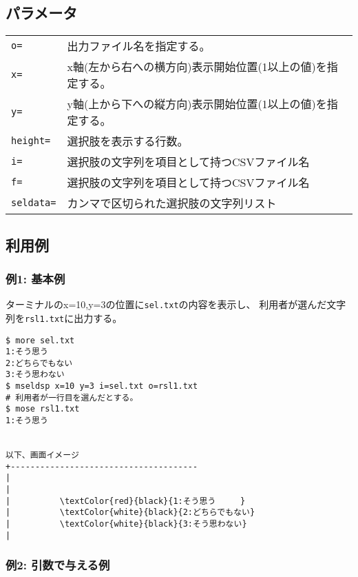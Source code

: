\subsection*{パラメータ}
\begin{table}[htbp]
{\small
\begin{tabular}{ll}
\verb|o=|   & 出力ファイル名を指定する。\\
\verb|x=|   & x軸(左から右への横方向)表示開始位置(1以上の値)を指定する。\\
\verb|y=|   & y軸(上から下への縦方向)表示開始位置(1以上の値)を指定する。\\
\verb|height=| & 選択肢を表示する行数。 \\
\verb|i=|   & 選択肢の文字列を項目として持つCSVファイル名 \\
\verb|f=|   & 選択肢の文字列を項目として持つCSVファイル名 \\
\verb|seldata=| & カンマで区切られた選択肢の文字列リスト \\
\end{tabular} 
}
\end{table} 

\subsection*{利用例}

\subsubsection*{例1: 基本例}

ターミナルのx=10,y=3の位置に\verb|sel.txt|の内容を表示し、
利用者が選んだ文字列を\verb|rsl1.txt|に出力する。

\begin{Verbatim}[baselinestretch=0.7,frame=single,commandchars=\\\{\}]
$ more sel.txt
1:そう思う
2:どちらでもない
3:そう思わない
$ mseldsp x=10 y=3 i=sel.txt o=rsl1.txt
# 利用者が一行目を選んだとする。
$ mose rsl1.txt
1:そう思う


以下、画面イメージ
+--------------------------------------
|
|
|          \textColor{red}{black}{1:そう思う　　　}
|          \textColor{white}{black}{2:どちらでもない}
|          \textColor{white}{black}{3:そう思わない}
|
\end{Verbatim}

\subsubsection*{例2: 引数で与える例}

